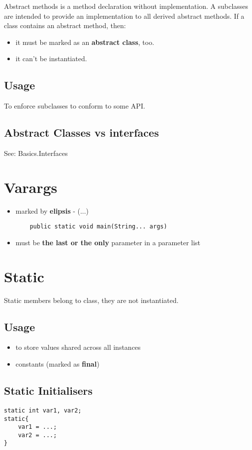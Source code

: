 \documentclass{report}
\begin{document}
Abstract methods is a method declaration without implementation. A subclasses are intended to provide an implementation to all derived abstract methods.
If a class contains an abstract method, then:
\begin{itemize}
	\item it must be marked as an \textbf{abstract class}, too.
	\item it can't be instantiated.
\end{itemize}

\section{Usage}
To enforce subclasses to conform to some API.

\section{Abstract Classes vs interfaces}
See: Basics.Interfaces

\chapter{Varargs}
\begin{itemize}
	\item marked by \textbf{elipsis} - (...)
	\begin{verbatim}
	public static void main(String... args)
	\end{verbatim}
	\item must be \textbf{the last or the only} parameter in a parameter list
\end{itemize}

\chapter{Static}
Static members belong to class, they are not instantiated.

\section{Usage}
\begin{itemize}
	\item to store values shared across all instances
	\item constants (marked as \textbf{final})
\end{itemize}

\section{Static Initialisers}
\begin{verbatim}
static int var1, var2;
static{
	var1 = ...;
	var2 = ...;
}
\end{verbatim}
\end{document}
